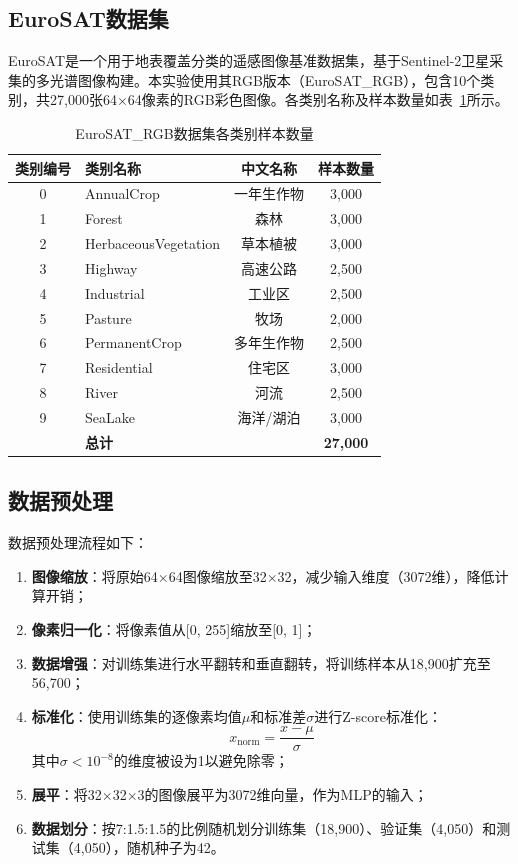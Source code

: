 \documentclass[12pt,a4paper]{article}
\begin{document}
\subsection{EuroSAT数据集}

EuroSAT是一个用于地表覆盖分类的遥感图像基准数据集，基于Sentinel-2卫星采集的多光谱图像构建。本实验使用其RGB版本（EuroSAT\_RGB），包含10个类别，共27,000张64$\times$64像素的RGB彩色图像。各类别名称及样本数量如表~\ref{tab:dataset}所示。

\begin{table}[H]
\centering
\caption{EuroSAT\_RGB数据集各类别样本数量}
\label{tab:dataset}
\begin{tabular}{clcc}
\toprule
\textbf{类别编号} & \textbf{类别名称} & \textbf{中文名称} & \textbf{样本数量} \\
\midrule
0 & AnnualCrop & 一年生作物 & 3,000 \\
1 & Forest & 森林 & 3,000 \\
2 & HerbaceousVegetation & 草本植被 & 3,000 \\
3 & Highway & 高速公路 & 2,500 \\
4 & Industrial & 工业区 & 2,500 \\
5 & Pasture & 牧场 & 2,000 \\
6 & PermanentCrop & 多年生作物 & 2,500 \\
7 & Residential & 住宅区 & 3,000 \\
8 & River & 河流 & 2,500 \\
9 & SeaLake & 海洋/湖泊 & 3,000 \\
\midrule
 & \textbf{总计} & & \textbf{27,000} \\
\bottomrule
\end{tabular}
\end{table}

\subsection{数据预处理}

数据预处理流程如下：

\begin{enumerate}[leftmargin=2em]
    \item \textbf{图像缩放}：将原始64$\times$64图像缩放至32$\times$32，减少输入维度（3072维），降低计算开销；
    \item \textbf{像素归一化}：将像素值从[0, 255]缩放至[0, 1]；
    \item \textbf{数据增强}：对训练集进行水平翻转和垂直翻转，将训练样本从18,900扩充至56,700；
    \item \textbf{标准化}：使用训练集的逐像素均值$\mu$和标准差$\sigma$进行Z-score标准化：
    \begin{equation}
        x_{\text{norm}} = \frac{x - \mu}{\sigma}
    \end{equation}
    其中$\sigma < 10^{-8}$的维度被设为1以避免除零；
    \item \textbf{展平}：将32$\times$32$\times$3的图像展平为3072维向量，作为MLP的输入；
    \item \textbf{数据划分}：按7:1.5:1.5的比例随机划分训练集（18,900）、验证集（4,050）和测试集（4,050），随机种子为42。
\end{enumerate}
\end{document}
